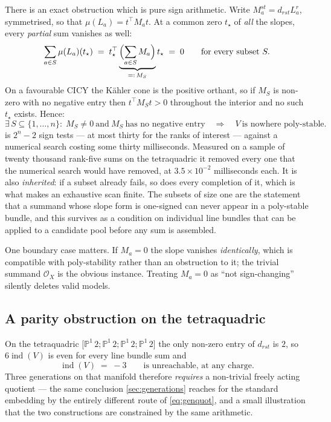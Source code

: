 \documentclass[11pt,a4paper]{article}
\newcommand{\PP}{\mathbb{P}}
\newcommand{\cO}{\mathcal{O}}
\theoremstyle{definition}
\begin{document}
There is an exact obstruction which is pure sign arithmetic. Write
$M_a^{st} = d_{rst} L_a^r$, symmetrised, so that $\mu(L_a) = t^{\top} M_a t$.
At a common zero $t_\star$ of \emph{all} the slopes, every \emph{partial} sum
vanishes as well:
%
\begin{equation}
\sum_{a \in S} \mu(L_a)(t_\star)
\;=\; t_\star^{\top}
\underbrace{\Bigl(\sum_{a \in S} M_a\Bigr)}_{=:\,M_S} t_\star
\;=\; 0
\qquad\text{for every subset } S .
\label{eq:subsetobstruction}
\end{equation}
%
On a favourable CICY the K\"ahler cone is the positive orthant, so if $M_S$ is
non-zero with no negative entry then $t^\top M_S t > 0$ throughout the interior
and no such $t_\star$ exists. Hence:
%
\begin{equation}
\exists\, S \subseteq \{1,\dots,n\} :\;
M_S \neq 0 \ \text{and} \ M_S \ \text{has no negative entry}
\quad\Longrightarrow\quad
V \ \text{is nowhere poly-stable.}
\label{eq:obstruction}
\end{equation}
%
 is $2^n - 2$ sign tests --- at most thirty for the ranks
of interest --- against a numerical search costing some thirty milliseconds.
Measured on a sample of twenty thousand rank-five sums on the tetraquadric it
removed every one that the numerical search would have removed, at
$3.5\times10^{-2}$ milliseconds each. It is also \emph{inherited}: if a
subset already fails, so does every completion of it, which is what makes an
exhaustive scan finite. The subsets of size one are the statement that a
summand whose slope form is one-signed can never appear in a poly-stable
bundle, and this survives as a condition on individual line bundles that can
be applied to a candidate pool before any sum is assembled.

One boundary case matters. If $M_a = 0$ the slope vanishes \emph{identically},
which is compatible with poly-stability rather than an obstruction to it; the
trivial summand $\cO_X$ is the obvious instance. Treating $M_a = 0$ as
``not sign-changing'' silently deletes valid models.

\subsection{A parity obstruction on the tetraquadric}

On the tetraquadric $\bigl[\PP^1\,2;\PP^1\,2;\PP^1\,2;\PP^1\,2\bigr]$ the only
non-zero entry of $d_{rst}$ is $2$, so $6\operatorname{ind}(V)$ is even for
every line bundle sum and
%
\begin{equation}
\operatorname{ind}(V) \;=\; -3
\qquad\text{is unreachable, at any charge.}
\label{eq:tetraparity}
\end{equation}
%
Three generations on that manifold therefore \emph{requires} a non-trivial
freely acting quotient --- the same conclusion \cref{sec:generations} reaches
for the standard embedding by the entirely different route of
\cref{eq:genquot}, and a small illustration that the two constructions are
constrained by the same arithmetic.
\end{document}
